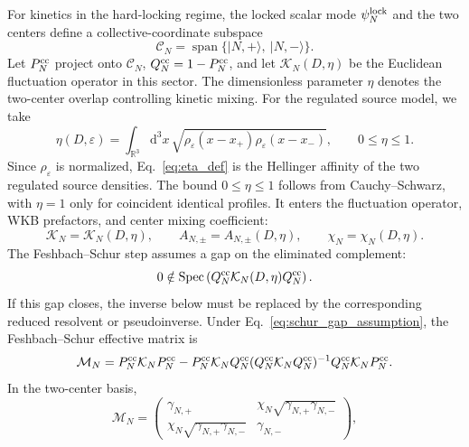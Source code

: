 \documentclass[aps,prd,preprint,notitlepage,nofootinbib,superscriptaddress,floatfix]{revtex4-2}
\newcommand{\dd}{\mathrm{d}}
\newcommand{\Span}{\operatorname{span}}
\newcommand{\cC}{\mathcal C}
\newcommand{\cK}{\mathcal K}
\newcommand{\cM}{\mathcal M}
\theoremstyle{remark}
\begin{document}
For kinetics in the hard-locking regime, the locked scalar mode \(\psi_N^{\rm lock}\) and the two centers define a collective-coordinate subspace
\begin{equation}
\cC_N=\Span\{|N,+\rangle,\ |N,-\rangle\}.
\end{equation}
Let \(P_N^{\rm cc}\) project onto \(\cC_N\), \(Q_N^{\rm cc}=1-P_N^{\rm cc}\), and let \(\cK_N(D,\eta)\) be the Euclidean fluctuation operator in this sector.
The dimensionless parameter \(\eta\) denotes the two-center overlap controlling kinetic mixing.
For the regulated source model, we take
\begin{equation}
\boxed{
\eta(D,\varepsilon)
=
\int_{\mathbb R^3}\dd^3x\,
\sqrt{
\rho_\varepsilon(x-x_+)\rho_\varepsilon(x-x_-)
},
\qquad
0\le \eta\le1.
}
\label{eq:eta_def}
\end{equation}
Since \(\rho_\varepsilon\) is normalized, Eq.~\eqref{eq:eta_def} is the Hellinger affinity of the two regulated source densities.
The bound \(0\le\eta\le1\) follows from Cauchy--Schwarz, with \(\eta=1\) only for coincident identical profiles.
It enters the fluctuation operator, WKB prefactors, and center mixing coefficient:
\begin{equation}
\cK_N=\cK_N(D,\eta),
\qquad
A_{N,\pm}=A_{N,\pm}(D,\eta),
\qquad
\chi_N=\chi_N(D,\eta).
\label{eq:eta_dependencies}
\end{equation}
The Feshbach--Schur step assumes a gap on the eliminated complement:
\begin{equation}
0\notin
\operatorname{Spec}
\left(
Q_N^{\rm cc}\cK_N(D,\eta)Q_N^{\rm cc}
\right).
\label{eq:schur_gap_assumption}
\end{equation}
If this gap closes, the inverse below must be replaced by the corresponding reduced resolvent or pseudoinverse.
Under Eq.~\eqref{eq:schur_gap_assumption}, the Feshbach--Schur effective matrix is \cite{Feshbach1958}
\begin{equation}
\cM_N
=
P_N^{\rm cc}\cK_NP_N^{\rm cc}
-P_N^{\rm cc}\cK_NQ_N^{\rm cc}
(Q_N^{\rm cc}\cK_NQ_N^{\rm cc})^{-1}
Q_N^{\rm cc}\cK_NP_N^{\rm cc}.
\label{eq:Schur_matrix}
\end{equation}
In the two-center basis,
\begin{equation}
\cM_N
=
\begin{pmatrix}
\gamma_{N,+} &
\chi_N\sqrt{\gamma_{N,+}\gamma_{N,-}}\\
\chi_N\sqrt{\gamma_{N,+}\gamma_{N,-}}&
\gamma_{N,-}
\end{pmatrix},
\end{equation}
\end{document}
